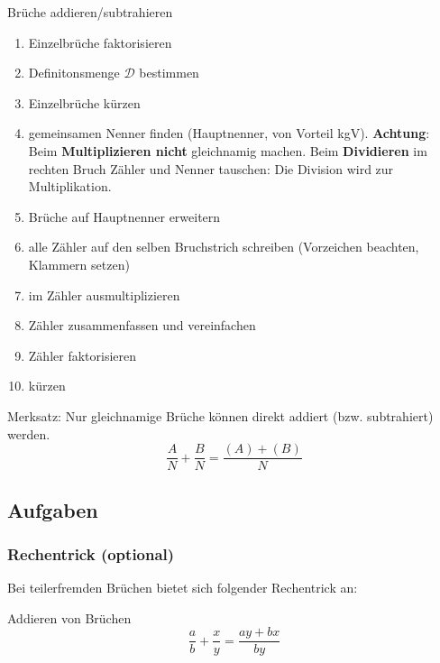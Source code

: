 \begin{rezept}{Brüche addieren/subtrahieren}{}\label{bruchtermeRezept}
\begin{enumerate}
	\item Einzelbrüche faktorisieren
  \item Definitonsmenge $\mathcal{D}$ bestimmen
	\item Einzelbrüche kürzen
	\item gemeinsamen Nenner finden (Hauptnenner, von Vorteil
	kgV). \textbf{Achtung}: Beim \textbf{Multiplizieren nicht}
	gleichnamig machen. Beim \textbf{Dividieren} im rechten Bruch Zähler
	und Nenner tauschen: Die Division wird zur Multiplikation.
	\item Brüche auf Hauptnenner erweitern
	\item alle Zähler auf den selben Bruchstrich schreiben (Vorzeichen beachten, Klammern setzen)
	\item im Zähler ausmultiplizieren
	\item Zähler zusammenfassen und vereinfachen
	\item Zähler faktorisieren
	\item kürzen
\end{enumerate}
\end{rezept}


\begin{gesetz}{}{}
Merksatz: Nur gleichnamige Brüche können direkt addiert (bzw. subtrahiert)
werden.
$$\frac{A}{N} + \frac{B}{N} = \frac{(A)+(B)}{N}$$
\end{gesetz}



\subsection*{Aufgaben}

%

\newpage

\subsubsection{Rechentrick (optional)}
Bei teilerfremden Brüchen bietet sich folgender Rechentrick an:

\begin{gesetz}{Addieren von Brüchen}{}
$$\frac{a}{b} + \frac{x}{y} = \frac{ay + bx}{by}$$
\end{gesetz}

